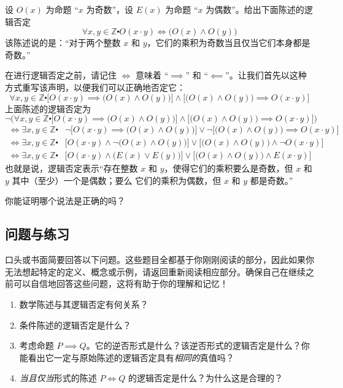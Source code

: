 \begin{example}
    设 $O(x)$ 为命题 ``$x$ 为奇数''，设 $E(x)$ 为命题 ``$x$ 为偶数''。给出下面陈述的逻辑否定
    \[\forall x, y \in \mathbb{Z} \centerdot O(x \cdot y) \iff \big(O(x) \land O(y)\big)\]
    该陈述说的是：``对于两个整数 $x$ 和 $y$，它们的乘积为奇数当且仅当它们本身都是奇数。''

    在进行逻辑否定之前，请记住 $\iff$ 意味着 ``$\implies$'' 和 ``$\impliedby$''。让我们首先以这种方式重写该声明，以便我们可以正确地否定它：
    \[\forall x, y \in \mathbb{Z} \centerdot \Big[O(x \cdot y) \implies \big(O(x) \land O(y)\big)\Big] \land \Big[\big(O(x) \land O(y)\big) \implies O(x \cdot y)\Big]\]
    上面陈述的逻辑否定为
    \[\neg \bigg(\forall x, y \in \mathbb{Z} \centerdot \Big[O(x \cdot y) \implies \big(O(x) \land O(y)\big)\Big] \land \Big[\big(O(x) \land O(y)\big) \implies O(x \cdot y)\Big]\bigg) \]
    \begin{align*}
        \iff \exists x, y \in \mathbb{Z} \centerdot & \neg \Big[O(x \cdot y) \implies \big(O(x) \land O(y)\big)\Big] \lor \neg \Big[\big(O(x) \land O(y)\big) \implies O(x \cdot y)\Big] \\
        \iff \exists x, y \in \mathbb{Z} \centerdot & \Big[O(x \cdot y) \land \neg \big(O(x) \land O(y)\big)\Big] \lor \Big[\big(O(x) \land O(y)\big) \land \neg O(x \cdot y)\Big] \\
        \iff \exists x, y \in \mathbb{Z} \centerdot & \Big[O(x \cdot y) \land \big(E(x) \lor E(y)\big)\Big] \lor \Big[\big(O(x) \land O(y)\big) \land E(x \cdot y)\Big] 
    \end{align*}
    也就是说，逻辑否定表示``存在整数 $x$ 和 $y$，使得它们的乘积要么是奇数，但 $x$ 和 $y$ 其中（至少）一个是偶数；要么 它们的乘积为偶数，但 $x$ 和 $y$ 都是奇数。''

    你能证明哪个说法是正确的吗？
\end{example}

\subsection{问题与练习}

口头或书面简要回答以下问题。这些题目全都基于你刚刚阅读的部分，因此如果你无法想起特定的定义、概念或示例，请返回重新阅读相应部分。确保自己在继续之前可以自信地回答这些问题，这将有助于你的理解和记忆！

\begin{enumerate}[label=(\arabic*)]
    \item 数学陈述与其逻辑否定有何关系？
    \item 条件陈述的逻辑否定是什么？
    \item 考虑命题 $P \implies Q$。它的逆否形式是什么？该逆否形式的逻辑否定是什么？你能看出它一定与原始陈述的逻辑否定具有\emph{相同的}真值吗？
    \item \emph{当且仅当}形式的陈述 $P \iff Q$ 的逻辑否定是什么？为什么这是合理的？
\end{enumerate}


